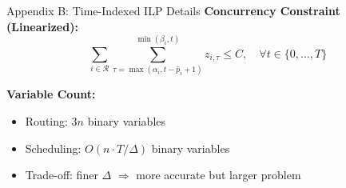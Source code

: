 \documentclass[aspectratio=169,10pt]{beamer}
\begin{document}
\begin{frame}[noframenumbering]
\hypertarget{app:ilp}{}{Appendix B: Time-Indexed ILP Details}
\textbf{Concurrency Constraint (Linearized):}
\begin{equation*}
\sum_{i \in \mathcal{R}} \sum_{\tau=\max(\alpha_i, t-\hat{p}_i+1)}^{\min(\beta_i, t)} z_{i,\tau} \leq C, \quad \forall t \in \{0, \ldots, T\}
\end{equation*}

\vspace{0.3cm}
\textbf{Variable Count:}
\begin{itemize}
    \item Routing: $3n$ binary variables
    \item Scheduling: $O(n \cdot T / \Delta)$ binary variables
    \item Trade-off: finer $\Delta$ $\Rightarrow$ more accurate but larger problem
\end{itemize}
\end{frame}
\end{document}
